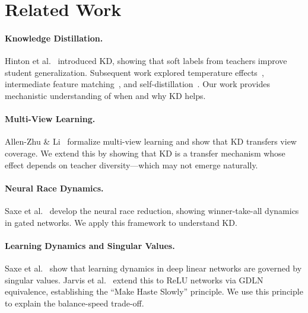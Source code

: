 \documentclass{article}
\begin{document}
\section{Related Work}
\label{sec:related}

\paragraph{Knowledge Distillation.} Hinton et al.~\cite{hinton2015distilling} introduced KD, showing that soft labels from teachers improve student generalization. Subsequent work explored temperature effects~\cite{hinton2015distilling}, intermediate feature matching~\cite{romero2015fitnets}, and self-distillation~\cite{furlanello2018born}. Our work provides mechanistic understanding of when and why KD helps.

\paragraph{Multi-View Learning.} Allen-Zhu \& Li~\cite{allen2023towards} formalize multi-view learning and show that KD transfers view coverage. We extend this by showing that KD is a transfer mechanism whose effect depends on teacher diversity---which may not emerge naturally.

\paragraph{Neural Race Dynamics.} Saxe et al.~\cite{saxe2022neural} develop the neural race reduction, showing winner-take-all dynamics in gated networks. We apply this framework to understand KD.

\paragraph{Learning Dynamics and Singular Values.} Saxe et al.~\cite{saxe2014exact} show that learning dynamics in deep linear networks are governed by singular values. Jarvis et al.~\cite{jarvis2025makehaste} extend this to ReLU networks via GDLN equivalence, establishing the ``Make Haste Slowly'' principle. We use this principle to explain the balance-speed trade-off.

\end{document}
